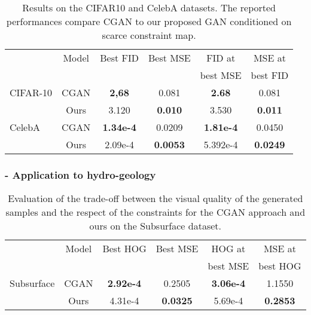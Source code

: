 \begin{table}[t]
	\centering
	\begin{tabular}{|l|c|c|c|c|c|}
		\hline
		&Model           & Best \ac{FID} & Best \ac{MSE} & \ac{FID} at & \ac{MSE} at \\
		&&&&best \ac{MSE} & best \ac{FID} \\
		\hline
		CIFAR-10 &CGAN   & \textbf{2,68}  & 0.081  & \textbf{2.68}  & 0.081\\
		&Ours            & 3.120 & \textbf{0.010} & 3.530 & \textbf{0.011} \\    
		\hline
		CelebA &CGAN      & \textbf{1.34e-4} & 0.0209 &  \textbf{1.81e-4} & 0.0450\\
		&Ours            & 2.09e-4& \textbf{0.0053} & 5.392e-4 & \textbf{0.0249} \\
		\hline
	\end{tabular}
	
	\caption[Results on the CIFAR10 and CelebA datasets]{Results on the CIFAR10 and CelebA datasets. The reported performances compare CGAN to our proposed GAN conditioned on scarce constraint map.}
	\label{tab:cifar10}
\end{table}


\vspace{0.4cm}

\subsubsection{- Application to hydro-geology}
\label{subs:subsurface}

\begin{table}[b]
	\centering
	\begin{tabular}{|l|c|c|c|c|c|}
		\hline
		&Model           & Best \ac{HOG} & Best \ac{MSE}& \ac{HOG} at & \ac{MSE} at \\
		&&& &  best \ac{MSE} & best \ac{HOG} \\
		\hline
		Subsurface &CGAN   & \textbf{2.92e-4} & 0.2505 & \textbf{3.06e-4}  & 1.1550 \\
		&Ours            & 4.31e-4 & \textbf{0.0325}& 5.69e-4 & \textbf{0.2853} \\
		\hline
	\end{tabular}
	\caption[Evaluation of the trade-off between the visual quality of the respect of the constraints for the Subsurface dataset]{Evaluation of the trade-off between the visual quality of the generated samples and the respect of the constraints for the CGAN approach and ours on the Subsurface dataset.}
	\label{tab:subsurface}
\end{table}

